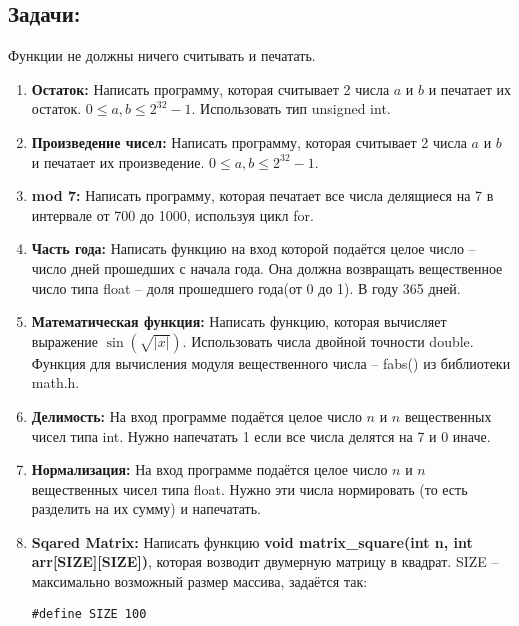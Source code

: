 \documentclass{article}
\begin{document}
\subsection*{Задачи:}
Функции не должны ничего считывать и печатать.
\begin{enumerate}
\item \textbf{Остаток:} Написать программу, которая считывает 2 числа $a$ и $b$ и печатает их остаток. $0 \le a, b \le 2^{32}-1$. Использовать тип unsigned int.
\item \textbf{Произведение чисел:} Написать программу, которая считывает 2 числа $a$ и $b$ и печатает их произведение. $0 \le a, b \le 2^{32}-1$.
\item \textbf{mod 7:} Написать программу, которая печатает все числа делящиеся на 7 в интервале от 700 до 1000, используя цикл for.
\item \textbf{Часть года:} Написать функцию на вход которой подаётся целое число -- число дней прошедших с начала года. Она должна возвращать вещественное число типа float -- доля прошедшего года(от 0 до 1). В году 365 дней.
\item \textbf{Математическая функция:} Написать функцию, которая вычисляет выражение $\sin(\sqrt{|x|})$. Использовать числа двойной точности double. Функция для вычисления модуля вещественного числа -- fabs() из библиотеки math.h. 
\item \textbf{Делимость:} На вход программе подаётся целое число $n$ и $n$ вещественных чисел типа int. Нужно напечатать 1 если все числа делятся на 7 и 0 иначе.
\item \textbf{Нормализация:} На вход программе подаётся целое число $n$ и $n$ вещественных чисел типа float. Нужно эти числа нормировать (то есть разделить на их сумму) и напечатать.
\item \textbf{Sqared Matrix:} Написать функцию \textbf{void matrix\_square(int n, int arr[SIZE][SIZE])}, которая возводит двумерную матрицу в квадрат. SIZE -- максимально возможный размер массива, задаётся  так:
\begin{verbatim}
#define SIZE 100
\end{verbatim}
\end{enumerate}
\end{document}

